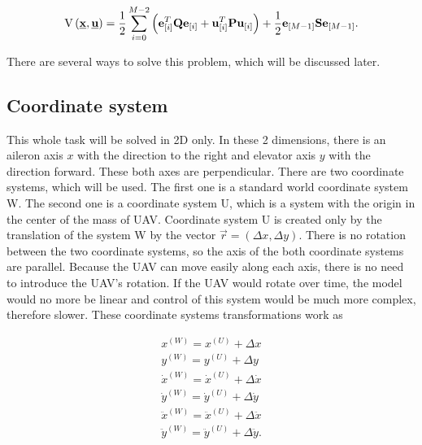 \documentclass{article}
\begin{document}
\begin{equation}
\label{eq:QP_formulation}
\begin{split}
\mathrm{V}\left(\textbf{\underline{x}}, \textbf{\underline{u}}\right) = \frac{1}{2}\sum_{i=0}^{M-2}\left(\textbf{e}^T_{[i]}\textbf{Q}\textbf{e}_{[i]} + \textbf{u}^T_{[i]}\textbf{P}\textbf{u}_{[i]}\right) + \frac{1}{2}\textbf{e}_{[M-1]}\textbf{S}\textbf{e}_{[M-1]}.
\end{split}
\end{equation}


There are several ways to solve this problem, which will be discussed later.





\subsection{Coordinate system}
\label{ssec:coordinate_system}
This whole task will be solved in 2D only. In these 2 dimensions, there is an aileron axis $x$ with the direction to the right and elevator axis $y$ with the direction forward. These both axes are perpendicular. There are two coordinate systems, which will be used. The first one is a standard world coordinate system W. The second one is a coordinate system U, which is a system with the origin in the center of the mass of UAV. Coordinate system U is created only by the translation of the system W by the vector $\vec{r} = (\Delta x, \Delta y)$. There is no rotation between the two coordinate systems, so the axis of the both coordinate systems are parallel. Because the UAV can move easily along each axis, there is no need to introduce the UAV's rotation. If the UAV would rotate over time, the model would no more be linear and control of this system would be much more complex, therefore slower. These coordinate systems transformations work as

\begin{equation}
\label{eq:coordinate_transform}
\begin{split}
x^{(W)} = x^{(U)}+\Delta x	\\
y^{(W)} = y^{(U)}+\Delta y	\\
\dot{x}^{(W)} = \dot{x}^{(U)}+\Delta \dot{x}	\\
\dot{y}^{(W)} = \dot{y}^{(U)}+\Delta \dot{y}	\\
\ddot{x}^{(W)} = \ddot{x}^{(U)}+\Delta \ddot{x}	\\
\ddot{y}^{(W)} = \ddot{y}^{(U)}+\Delta \ddot{y}.	\\
\end{split}
\end{equation}
\end{document}
